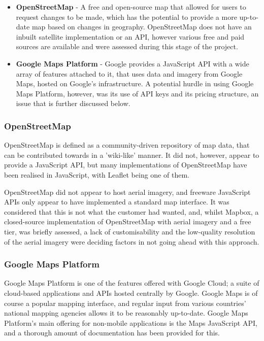 \begin{itemize}
\item	\textbf{OpenStreetMap} - A free and open-source map that allowed for users to request changes to be made, which has the potential to provide a more up-to-date map based on changes in geography. OpenStreetMap does not have an inbuilt satellite implementation or an API, however various free and paid sources are available and were assessed during this stage of the project.
\item	\textbf{Google Maps Platform} - Google provides a JavaScript API with a wide array of features attached to it, that uses data and imagery from Google Maps, hosted on Google's infrastructure. A potential hurdle in using Google Maps Platform, however, was its use of API keys and its pricing structure, an issue that is further discussed below.
\end{itemize}

\subsubsection{OpenStreetMap}

OpenStreetMap is defined as a community-driven repository of map data, that can be contributed towards in a 'wiki-like' manner. It did not, however, appear to provide a JavaScript API, but many implementations of OpenStreetMap have been realised in JavaScript, with Leaflet being one of them.

OpenStreetMap did not appear to host aerial imagery, and freeware JavaScript APIs only appear to have implemented a standard map interface. It was considered that this is not what the customer had wanted, and, whilst Mapbox, a closed-source implementation of OpenStreetMap with aerial imagery and a free tier, was briefly assessed, a lack of customisability and the low-quality resolution of the aerial imagery were deciding factors in not going ahead with this approach.

\subsubsection{Google Maps Platform}

Google Maps Platform is one of the features offered with Google Cloud; a suite of cloud-based applications and APIs hosted centrally by Google. Google Maps is of course a popular mapping interface, and regular input from various countries' national mapping agencies allows it to be reasonably up-to-date. Google Maps Platform's main offering for non-mobile applications is the Maps JavaScript API, and a thorough amount of documentation has been provided for this.

